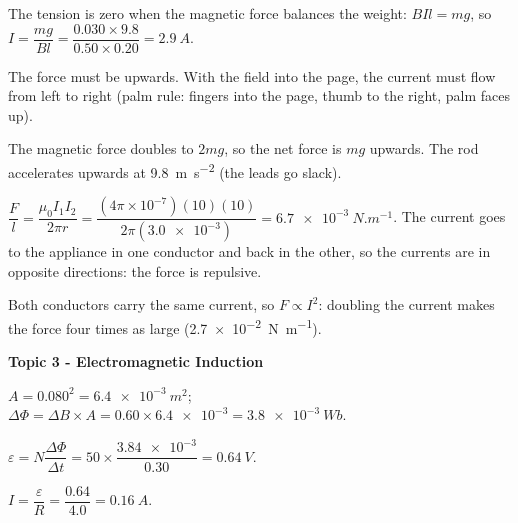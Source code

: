 \documentclass[12pt]{article}
\newcommand\anstopic[1]{\par\Needspace{8\baselineskip}\vspace{4mm}%
  \begin{center}{\headfont\bfseries\fontsize{14}{18}\selectfont #1\par}\end{center}\vspace{2pt}}
\begin{document}
\ansq
{}
\begin{crit}
\end{crit}
\sample
The tension is zero when the magnetic force balances the weight: $BIl = mg$, so
$I = \dfrac{mg}{Bl} = \dfrac{0.030 \times 9.8}{0.50 \times 0.20} = \qty{2.9}{A}$.
\begin{crit}
\end{crit}
\sample
The force must be upwards. With the field into the page, the current must flow from left to right
(palm rule: fingers into the page, thumb to the right, palm faces up).
\begin{crit}
\end{crit}
\sample
The magnetic force doubles to $2mg$, so the net force is $mg$ upwards. The rod accelerates upwards at
\qty{9.8}{m.s^{-2}} (the leads go slack).

\ansq
{}
\begin{crit}
\end{crit}
\sample
$\dfrac{F}{l} = \dfrac{\mu_0 I_1 I_2}{2\pi r} = \dfrac{(4\pi\times10^{-7})(10)(10)}{2\pi(\num{3.0e-3})}
= \qty{6.7e-3}{N.m^{-1}}$. The current goes to the appliance in one conductor and back in the other, so
the currents are in opposite directions: the force is repulsive.
\begin{crit}
\end{crit}
\sample
Both conductors carry the same current, so $F \propto I^2$: doubling the current makes the force four
times as large (\qty{2.7e-2}{N.m^{-1}}).

\anstopic{Topic 3 - Electromagnetic Induction}

\ansq
{}
\begin{crit}
\end{crit}
\sample
$A = 0.080^2 = \qty{6.4e-3}{m^2}$; $\Delta\Phi = \Delta B \times A = 0.60 \times \num{6.4e-3} = \qty{3.8e-3}{Wb}$.
\begin{crit}
\end{crit}
\sample
$\varepsilon = N\dfrac{\Delta\Phi}{\Delta t} = 50 \times \dfrac{\num{3.84e-3}}{0.30} = \qty{0.64}{V}$.
\begin{crit}
\end{crit}
\sample
$I = \dfrac{\varepsilon}{R} = \dfrac{0.64}{4.0} = \qty{0.16}{A}$.
\end{document}
